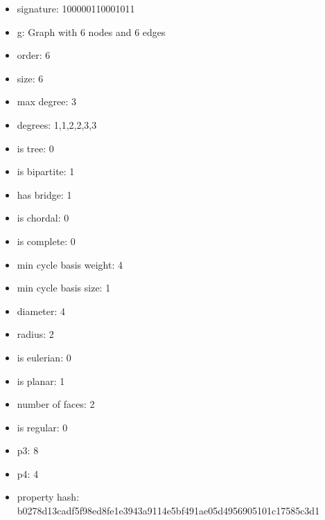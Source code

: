 \begin{itemize}
\item signature: 100000110001011
\item g: Graph with 6 nodes and 6 edges
\item order: 6
\item size: 6
\item max degree: 3
\item degrees: 1,1,2,2,3,3
\item is tree: 0
\item is bipartite: 1
\item has bridge: 1
\item is chordal: 0
\item is complete: 0
\item min cycle basis weight: 4
\item min cycle basis size: 1
\item diameter: 4
\item radius: 2
\item is eulerian: 0
\item is planar: 1
\item number of faces: 2
\item is regular: 0
\item p3: 8
\item p4: 4
\item property hash: b0278d13cadf5f98ed8fe1e3943a9114e5bf491ae05d4956905101c17585c3d1
\end{itemize}
\newpage
\begin{figure}
\end{figure}
